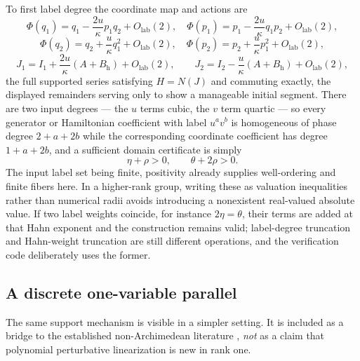 \documentclass[11pt,letterpaper]{article}
\theoremstyle{definition}
\theoremstyle{remark}
\numberwithin{equation}{section}
\begin{document}
To first label degree the coordinate map and actions are
\[
 \Phi(q_1)=q_1-\frac{2u}{\kappa}p_1q_2+O_{\mathrm{lab}}(2),\quad
 \Phi(p_1)=p_1-\frac{2u}{\kappa}q_1p_2+O_{\mathrm{lab}}(2),
\]
\[
 \Phi(q_2)=q_2+\frac{u}{\kappa}q_1^{2}+O_{\mathrm{lab}}(2),\quad
 \Phi(p_2)=p_2+\frac{u}{\kappa}p_1^{2}+O_{\mathrm{lab}}(2),
\]
\[
 J_1=I_1+\frac{2u}{\kappa}(A+B_{\mathrm h})+O_{\mathrm{lab}}(2),\qquad
 J_2=I_2-\frac{u}{\kappa}(A+B_{\mathrm h})+O_{\mathrm{lab}}(2),
\]
the full supported series satisfying $H=N(J)$ and commuting exactly, the
displayed remainders serving only to show a manageable initial segment.
There are two input degrees --- the $u$ terms cubic, the $v$ term quartic
--- so every generator or Hamiltonian coefficient with label $u^{a}v^{b}$
is homogeneous of phase degree $2+a+2b$ while the corresponding coordinate
coefficient has degree $1+a+2b$, and a sufficient domain certificate is
simply
\begin{equation}\label{dyn:eq:exampledomain}
 \eta+\rho>0,\qquad \theta+2\rho>0 .
\end{equation}
The input label set being finite, positivity already supplies well-ordering
and finite fibers here. In a higher-rank group, writing these as valuation
inequalities rather than numerical radii avoids introducing a nonexistent
real-valued absolute value. If two label weights coincide, for instance
$2\eta=\theta$, their terms are added at that Hahn exponent and the
construction remains valid; label-degree truncation and Hahn-weight
truncation are still different operations, and the verification code
deliberately uses the former.

\subsection{A discrete one-variable parallel}
\label{dyn:subsec:discrete}

The same support mechanism is visible in a simpler setting. It is included
as a bridge to the established non-Archimedean literature
\cite{Lindahl}, \emph{not} as a claim that polynomial perturbative
linearization is new in rank one.
\end{document}
